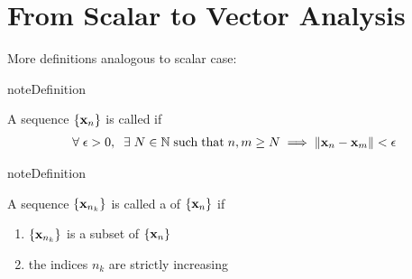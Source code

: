 \documentclass[letterpaper,10pt,english]{jupyterBook}
\begin{document}
\section{From Scalar to Vector Analysis}
\label{\detokenize{04.basic_analysis:from-scalar-to-vector-analysis}}
\sphinxAtStartPar
More definitions analogous to scalar case:

\begin{sphinxadmonition}{note}{Definition}

\sphinxAtStartPar
A sequence \(\{{\bf x}_n\}\) is called  if
\begin{equation*}
\begin{split}
\forall \; \epsilon > 0, \;\; \exists \; N \in \mathbb{N} 
\; \mathrm{such\;that}\;  n, m \geq N \implies \| {\bf x}_n - {\bf x}_m \| < \epsilon
\end{split}
\end{equation*}\end{sphinxadmonition}

\begin{sphinxadmonition}{note}{Definition}

\sphinxAtStartPar
A sequence \(\{{\bf x}_{n_k} \}\) is called a  of \(\{{\bf x}_n\}\) if
\begin{enumerate}
%
\item {} 
\sphinxAtStartPar
\(\{{\bf x}_{n_k} \}\) is a subset of \(\{{\bf x}_n\}\)

\item {} 
\sphinxAtStartPar
the indices \(n_k\) are strictly increasing

\end{enumerate}
\end{sphinxadmonition}
\end{document}
